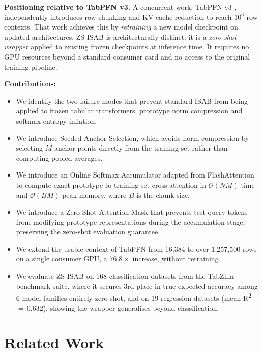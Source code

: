 \documentclass[10pt]{article}
\begin{document}
\textbf{Positioning relative to TabPFN v3.} A concurrent work, TabPFN v3 \citep{hollmann2025tabpfn3}, independently introduces row-chunking and KV-cache reduction to reach $10^6$-row contexts. That work achieves this by \emph{retraining} a new model checkpoint on updated architectures. ZS-ISAB is architecturally distinct: it is a \emph{zero-shot wrapper} applied to existing frozen checkpoints at inference time. It requires no GPU resources beyond a standard consumer card and no access to the original training pipeline.

\textbf{Contributions:}
\begin{itemize}
    \item We identify the two failure modes that prevent standard ISAB from being applied to frozen tabular transformers: prototype norm compression and softmax entropy inflation.
    \item We introduce Seeded Anchor Selection, which avoids norm compression by selecting $M$ anchor points directly from the training set rather than computing pooled averages.
    \item We introduce an Online Softmax Accumulator adapted from FlashAttention \citep{dao2022flashattention} to compute exact prototype-to-training-set cross-attention in $\mathcal{O}(NM)$ time and $\mathcal{O}(BM)$ peak memory, where $B$ is the chunk size.
    \item We introduce a Zero-Shot Attention Mask that prevents test query tokens from modifying prototype representations during the accumulation stage, preserving the zero-shot evaluation guarantee.
    \item We extend the usable context of TabPFN from 16{,}384 to over 1{,}257{,}500 rows on a single consumer GPU, a $76.8\times$ increase, without retraining.
    \item We evaluate ZS-ISAB on 168 classification datasets from the TabZilla benchmark suite, where it secures 3rd place in true expected accuracy among 6 model families entirely zero-shot, and on 19 regression datasets (mean R\textsuperscript{2}\,$=$\,0.632), showing the wrapper generalises beyond classification.
\end{itemize}

\section{Related Work}
\end{document}
